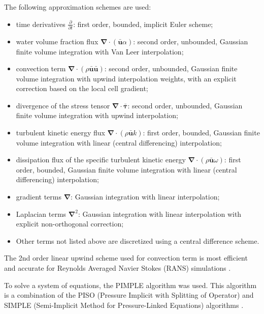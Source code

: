 \documentclass[applsci,article,submit,moreauthors,pdftex]{Definitions/mdpi}
\begin{document}
The following approximation schemes are used:
\begin{itemize}
	\item time derivatives $\frac{\partial}{\partial t}$: first order, bounded, implicit Euler scheme;
	\item water volume fraction flux $\boldsymbol{\nabla} \cdot (\bar{\boldsymbol{u}} \alpha)$: second order, unbounded, Gaussian finite volume integration with Van Leer interpolation;
	\item convection term $\boldsymbol{\nabla} \cdot (\rho \bar{\boldsymbol{u}} \bar{\boldsymbol{u}})$: second order, unbounded, Gaussian finite volume integration with upwind interpolation weights, with an explicit correction based on the local cell gradient;
	\item divergence of the stress tensor $\boldsymbol{\nabla} \cdot \bar{\boldsymbol{\tau}}$: second order, unbounded, Gaussian finite volume integration with upwind interpolation;
	\item turbulent kinetic energy flux $\boldsymbol{\nabla} \cdot (\rho \bar{\boldsymbol{u}} k)$: first order, bounded, Gaussian finite volume integration with linear (central differencing) interpolation;
	\item dissipation flux of the specific turbulent kinetic energy $\boldsymbol{\nabla} \cdot (\rho \bar{\boldsymbol{u}} \omega)$: first order, bounded, Gaussian finite volume integration with linear (central differencing) interpolation;
	\item gradient terms $\boldsymbol{\nabla}$: Gaussian integration with linear interpolation;
	\item Laplacian terms $\boldsymbol{\nabla}^2$: Gaussian integration with linear interpolation with explicit non-orthogonal correction;
	\item Other terms not listed above are discretized using a central difference scheme.
\end{itemize}

The 2nd order linear upwind scheme used for convection term is most efficient and accurate for Reynolds Averaged Navier Stokes (RANS) simulations \cite{ROBERTSON2015122}.

To solve a system of equations, the PIMPLE \cite{Holzmann2019, Yin2003} algorithm was used. This algorithm is a combination of the PISO (Pressure Implicit with Splitting of Operator) \cite{Issa1986_2} and SIMPLE (Semi-Implicit Method for Pressure-Linked Equations) algorithms \cite{Issa1986_1}.
\end{document}
